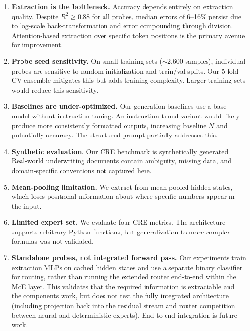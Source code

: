 \begin{enumerate}
\item \textbf{Extraction is the bottleneck.} Accuracy depends entirely
on extraction quality. Despite $R^2 \geq 0.88$ for all probes,
median errors of 6--16\% persist due to log-scale
back-transformation and error compounding through division.
Attention-based extraction over specific token positions is the
primary avenue for improvement.

\item \textbf{Probe seed sensitivity.} On small training sets
(${\sim}$2{,}600 samples), individual probes are sensitive to random
initialization and train/val splits. Our 5-fold CV ensemble
mitigates this but adds training complexity. Larger training sets
would reduce this sensitivity.

\item \textbf{Baselines are under-optimized.} Our generation baselines
use a base model without instruction tuning. An instruction-tuned
variant would likely produce more consistently formatted outputs,
increasing baseline $N$ and potentially accuracy. The structured
prompt partially addresses this.

\item \textbf{Synthetic evaluation.} Our CRE benchmark is synthetically
generated. Real-world underwriting documents contain ambiguity,
missing data, and domain-specific conventions not captured here.

\item \textbf{Mean-pooling limitation.} We extract from mean-pooled
hidden states, which loses positional information about where
specific numbers appear in the input.

\item \textbf{Limited expert set.} We evaluate four CRE metrics. The
architecture supports arbitrary Python functions, but generalization
to more complex formulas was not validated.

\item \textbf{Standalone probes, not integrated forward pass.} Our
experiments train extraction MLPs on cached hidden states and use a
separate binary classifier for routing, rather than running the
extended router end-to-end within the MoE layer. This validates
that the required information is extractable and the components
work, but does not test the fully integrated architecture
(including projection back into the residual stream and router
competition between neural and deterministic experts). End-to-end
integration is future work.
\end{enumerate}

